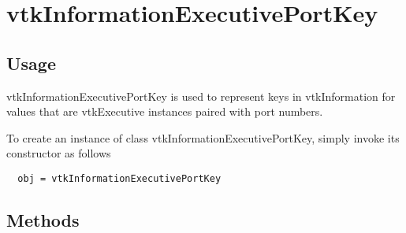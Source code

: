 \section{vtkInformationExecutivePortKey}

\subsection{Usage}

 vtkInformationExecutivePortKey is used to represent keys in
 vtkInformation for values that are vtkExecutive instances paired
 with port numbers.

To create an instance of class vtkInformationExecutivePortKey, simply
invoke its constructor as follows
\begin{verbatim}
  obj = vtkInformationExecutivePortKey
\end{verbatim}
\subsection{Methods}

